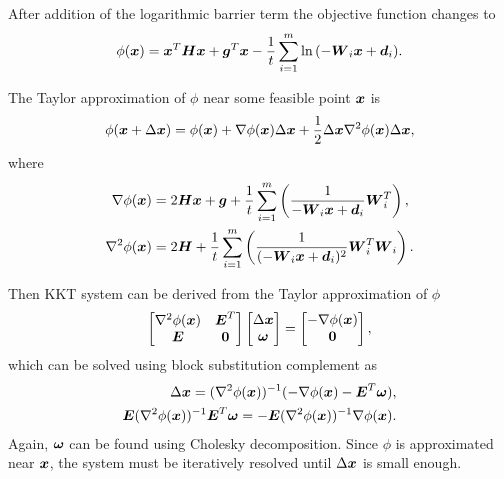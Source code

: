 After addition of the logarithmic barrier term the objective function changes to
$$
    \phi(\mbox{\boldmath $x$}) = \mbox{\boldmath $x$}^T \mbox{\boldmath $H$} \mbox{\boldmath $x$} + \mbox{\boldmath $g$}^T \mbox{\boldmath $x$} 
        -\frac{1}{t} \sum^m_{i=1} \ln {(-\mbox{\boldmath $W$}_i \mbox{\boldmath $x$} + \mbox{\boldmath $d$}_i)}.
$$

The Taylor approximation of $\phi$ near some feasible point $\mbox{\boldmath $x$}$ is
$$
    \phi(\mbox{\boldmath $x$} + \Delta\mbox{\boldmath $x$}) = \phi(\mbox{\boldmath $x$}) + \nabla\phi({\mbox{\boldmath $x$}})\Delta\mbox{\boldmath $x$}
        + \frac{1}{2} \Delta\mbox{\boldmath $x$} \nabla^2 \phi(\mbox{\boldmath $x$}) \Delta\mbox{\boldmath $x$},
$$
where
\begin{equation*}
\begin{split}
    \nabla\phi(\mbox{\boldmath $x$}) &= 2\mbox{\boldmath $H$}\mbox{\boldmath $x$} + \mbox{\boldmath $g$} + \frac{1}{t} \sum^m_{i=1} 
        \left( 
            \frac{1}{-\mbox{\boldmath $W$}_i\mbox{\boldmath $x$} + \mbox{\boldmath $d$}_i} \mbox{\boldmath $W$}_i^T 
        \right),\\
    \nabla^2\phi(\mbox{\boldmath $x$}) &= 2\mbox{\boldmath $H$} + \frac{1}{t} \sum^m_{i=1} 
        \left( 
            \frac{1}{(-\mbox{\boldmath $W$}_i\mbox{\boldmath $x$} + \mbox{\boldmath $d$}_i)^2} \mbox{\boldmath $W$}_i^T \mbox{\boldmath $W$}_i
        \right).
\end{split}
\end{equation*}

Then \ac{KKT} system can be derived from the Taylor approximation of $\phi$ 
$$
\begin{bmatrix}
    \nabla^2\phi(\mbox{\boldmath $x$})   &   \mbox{\boldmath $E$}^T\\
    \mbox{\boldmath $E$}                 &   \mbox{\boldmath $0$}\\
\end{bmatrix}
\begin{bmatrix}
    \Delta\mbox{\boldmath $x$}\\
    \mbox{\boldmath $\omega$}\\
\end{bmatrix}
=
\begin{bmatrix}
    -\nabla\phi(\mbox{\boldmath $x$})\\
    \mbox{\boldmath $0$}\\
\end{bmatrix},
$$
which can be solved using block substitution complement as
\begin{equation*}
\begin{split}
    \Delta\mbox{\boldmath $x$} = (\nabla^2\phi(\mbox{\boldmath $x$}))^{-1}
        (-\nabla\phi(\mbox{\boldmath $x$}) - \mbox{\boldmath $E$}^T \mbox{\boldmath $\omega$}),\\
    \mbox{\boldmath $E$} (\nabla^2\phi(\mbox{\boldmath $x$}))^{-1} \mbox{\boldmath $E$}^T \mbox{\boldmath $\omega$} =
        - \mbox{\boldmath $E$} (\nabla^2\phi(\mbox{\boldmath $x$}))^{-1} \nabla\phi(\mbox{\boldmath $x$}).
\end{split}
\end{equation*}
Again, $\mbox{\boldmath $\omega$}$ can be found using Cholesky decomposition. Since $\phi$ is
approximated near $\mbox{\boldmath $x$}$, the system must be iteratively resolved until 
$\Delta\mbox{\boldmath $x$}$ is small enough.


